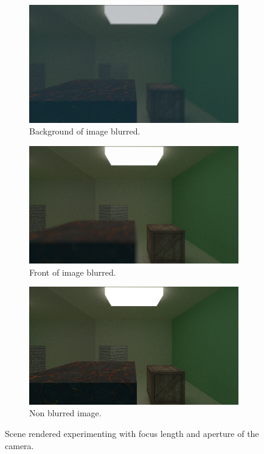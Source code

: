 \documentclass[titlepage,12pt]{report}
\begin{document}
\begin{figure}[H]
	\centering
	\medskip
	\begin{subfigure}{.48\textwidth}
		\centering
		\includegraphics[scale=0.315]{media/cornell_textures_dof_1.png}
		\caption{Background of image blurred.}
		\label{dof1}
	\end{subfigure}
	\begin{subfigure}{.48\textwidth}
		\centering
		\includegraphics[scale=0.315]{media/cornell_textures_dof_2.png}
		\caption{Front of image blurred.}
		\label{dof2}
	\end{subfigure}
	
	\medskip
	\begin{subfigure}{.98\textwidth}
		\centering
		\includegraphics[scale=0.65]{media/cornell_textures_dof_3.png}	
		\caption{Non blurred image.}
		\label{dof3}
	\end{subfigure}
	\caption{Scene rendered experimenting with focus length and aperture of the camera.}
	\label{dof}
\end{figure}
\end{document}
